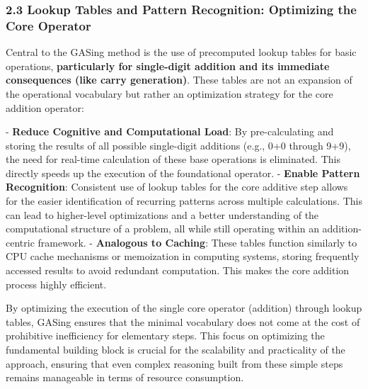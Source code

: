 \subsubsection{2.3 Lookup Tables and Pattern Recognition: Optimizing the Core Operator}

Central to the GASing method is the use of precomputed lookup tables for basic operations, \textbf{particularly for single-digit addition and its immediate consequences (like carry generation)}. These tables are not an expansion of the operational vocabulary but rather an optimization strategy for the core addition operator:

-   \textbf{Reduce Cognitive and Computational Load}: By pre-calculating and storing the results of all possible single-digit additions (e.g., 0+0 through 9+9), the need for real-time calculation of these base operations is eliminated. This directly speeds up the execution of the foundational operator.
-   \textbf{Enable Pattern Recognition}: Consistent use of lookup tables for the core additive step allows for the easier identification of recurring patterns across multiple calculations. This can lead to higher-level optimizations and a better understanding of the computational structure of a problem, all while still operating within an addition-centric framework.
-   \textbf{Analogous to Caching}: These tables function similarly to CPU cache mechanisms or memoization in computing systems, storing frequently accessed results to avoid redundant computation. This makes the core addition process highly efficient.

By optimizing the execution of the single core operator (addition) through lookup tables, GASing ensures that the minimal vocabulary does not come at the cost of prohibitive inefficiency for elementary steps. This focus on optimizing the fundamental building block is crucial for the scalability and practicality of the approach, ensuring that even complex reasoning built from these simple steps remains manageable in terms of resource consumption.
